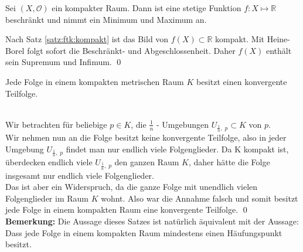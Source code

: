 \begin{Satz}
	Sei \((X, \mathcal{O})\) ein kompakter Raum. Dann ist eine stetige Funktion \(f: X \mapsto \mathbb{R}\) 
	beschränkt und nimmt ein Minimum und Maximum an.
\end{Satz}
%
	Nach Satz \ref{satz:ftk:kompakt} ist das Bild von \( f(X) \subset \mathbb{R} \) kompakt. Mit Heine-Borel 
	folgt sofort die Beschränkt- und Abgeschlossenheit. Daher \(f(X)\) enthält sein Supremum und Infimum.
\qed
	\begin{Satz}
		Jede Folge in einem kompakten metrischen Raum \(K\) besitzt einen konvergente Teilfolge.
	\end{Satz}
	\\
		Wir betrachten für beliebige \( p \in K \), die \( \frac{1}{n} \) - Umgebungen \( U_{\frac{1}{n},\;p} \subset K \) von \(p \). \\
		Wir nehmen nun an die Folge besitzt keine konvergente Teilfolge, also in jeder Umgebung  \( U_{\frac{1}{n},\;p} \) findet man nur endlich viele Folgenglieder. 
		Da K kompakt ist, überdecken endlich viele  \( U_{\frac{1}{n},\;p} \) den ganzen Raum \( K \), daher hätte die Folge insgesamt nur endlich viele Folgenglieder.\\
		Das ist aber ein Widerspruch, da die ganze Folge mit unendlich vielen Folgenglieder im Raum \(K \) wohnt. Also war die Annahme falsch und somit besitzt jede Folge in einem kompakten
		Raum eine konvergente Teilfolge.
	\qed\\
	{\bf Bemerkung:} Die Aussage dieses Satzes ist natürlich äquivalent mit der Aussage: Dass jede Folge in einem kompakten Raum mindestens einen Häufungspunkt besitzt. 
	


